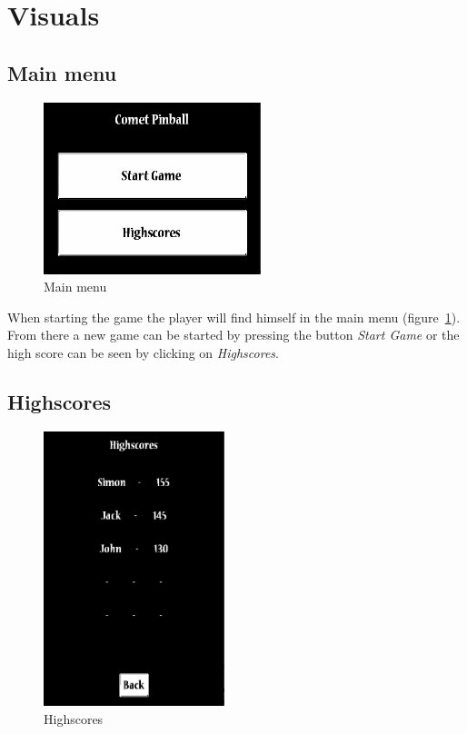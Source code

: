\documentclass[fontsize=12pt,
               paper=a4,
               twoside=false,
               parskip=half,
               ]{scrartcl}
\begin{document}
\section{Visuals}

\subsection{Main menu}

\begin{figure}[h!]
	\centering
	\includegraphics[height=5cm]{./img/manual/main_menu.png}
	\caption[Main menu]{Main menu}
	\label{fig:mainmenu}
\end{figure}

When starting the game the player will find himself in the main menu (figure~\ref{fig:mainmenu}). From there a new game can be started by pressing the button \emph{Start Game} or the high score can be seen by clicking on \emph{Highscores}.

\subsection{Highscores}

\begin{figure}[h!]
	\centering
	\includegraphics[height=8cm]{./img/manual/highscore.png}
	\caption[Highscores]{Highscores}
	\label{fig:highscore}
\end{figure}
\end{document}
